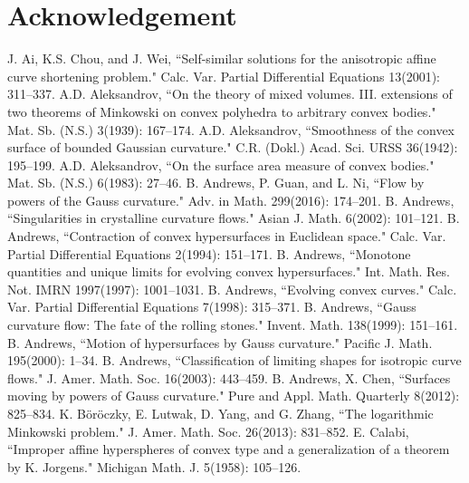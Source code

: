 \documentclass{amsart}
\theoremstyle{definition}
\theoremstyle{remark}
\numberwithin{equation}{section}
\begin{document}
\section*{Acknowledgement}


\begin{thebibliography}{10}
J. Ai, K.S. Chou, and J. Wei, ``Self-similar solutions for the anisotropic affine curve shortening problem." Calc. Var. Partial Differential Equations 13(2001): 311--337.
 A.D. Aleksandrov, ``On the theory of mixed volumes. III. extensions of two theorems of Minkowski on convex polyhedra to arbitrary convex bodies." Mat. Sb. (N.S.) 3(1939): 167--174.
 A.D. Aleksandrov, ``Smoothness of the convex surface of bounded Gaussian curvature." C.R. (Dokl.) Acad. Sci. URSS 36(1942): 195--199.
 A.D. Aleksandrov, ``On the surface area measure of convex bodies." Mat. Sb. (N.S.) 6(1983): 27--46.
 B. Andrews, P. Guan, and L. Ni, ``Flow by powers of the Gauss curvature." Adv. in Math. 299(2016): 174--201.
 B. Andrews, ``Singularities in crystalline curvature flows." Asian J. Math. 6(2002): 101--121.
 B. Andrews, ``Contraction of convex hypersurfaces in Euclidean space." Calc. Var. Partial Differential Equations 2(1994): 151--171.
 B. Andrews, ``Monotone quantities and unique limits for evolving convex hypersurfaces." Int. Math. Res. Not. IMRN 1997(1997): 1001--1031.
 B. Andrews, ``Evolving convex curves." Calc. Var. Partial Differential Equations 7(1998): 315--371.
 B. Andrews, ``Gauss curvature flow: The fate of the rolling stones." Invent. Math. 138(1999): 151--161.
 B. Andrews, ``Motion of hypersurfaces by Gauss curvature." Pacific J. Math. 195(2000): 1--34.
 B. Andrews, ``Classification of limiting shapes for isotropic curve flows." J. Amer. Math. Soc. 16(2003): 443--459.
 B. Andrews, X. Chen, ``Surfaces moving by powers of Gauss curvature." Pure and Appl. Math. Quarterly 8(2012): 825--834.
 K. B\"{o}r\"{o}czky, E. Lutwak, D. Yang, and G. Zhang, ``The logarithmic Minkowski problem." J. Amer. Math. Soc. 26(2013): 831--852.
 E. Calabi, ``Improper affine hyperspheres of convex type and a generalization of a theorem by K. Jorgens." Michigan Math. J. 5(1958): 105--126.

\end{thebibliography}
\end{document}
